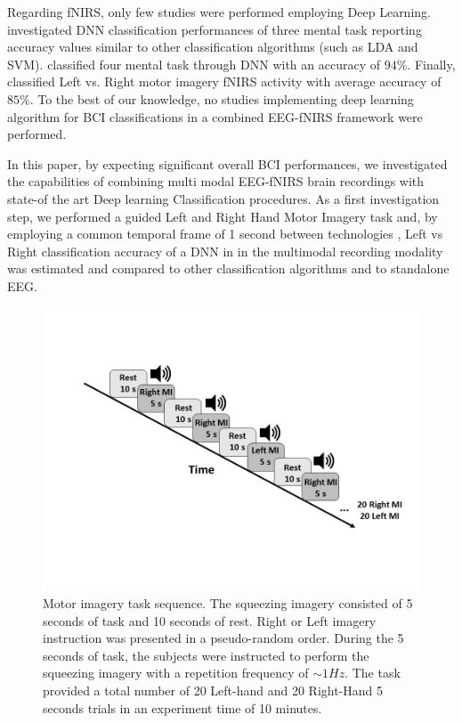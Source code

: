 \documentclass[12pt ]{iopart}
\begin{document}
Regarding fNIRS, only  few  studies were performed employing Deep Learning.  \textcite{hennrich2015investigating} investigated DNN classification performances of three mental task reporting accuracy values similar  to other classification algorithms (such as LDA and SVM).  \textcite{abibullaev2011neural} classified four mental task through DNN with an accuracy of $94\%$. Finally, \textcite{nguyen2013temporal} classified Left vs. Right motor imagery fNIRS activity with average accuracy of $85\%$. To the best of our knowledge, no studies implementing deep learning algorithm for BCI classifications  in a combined EEG-fNIRS framework were performed.

In this paper, by expecting significant overall BCI performances,  we investigated the capabilities of combining multi modal EEG-fNIRS brain recordings  with state-of the art Deep learning Classification procedures. As a first investigation step, we performed a guided Left and Right Hand Motor Imagery task \parencite{pfurtscheller1997motor} and, by employing a common temporal frame of 1 second between technologies \parencite{govindan2016novel}, Left vs Right classification accuracy of a DNN in in the multimodal recording modality was estimated and compared to other classification algorithms and to standalone EEG. 

\begin{figure}
	\includegraphics[width=\linewidth]{Slide1.JPG}
	\caption{ Motor imagery task sequence. The 
		squeezing imagery consisted of 5 seconds of task and 10 seconds of rest. Right or Left imagery instruction was presented in a pseudo-random order.  During the 5 seconds of task, the subjects were instructed to perform the squeezing imagery with a repetition frequency of $\sim1Hz$. The task provided a total number of 20 Left-hand and 20 Right-Hand 5 seconds trials in an experiment time of 10 minutes. }
	\label{fig:fig1}
\end{figure}
\end{document}
